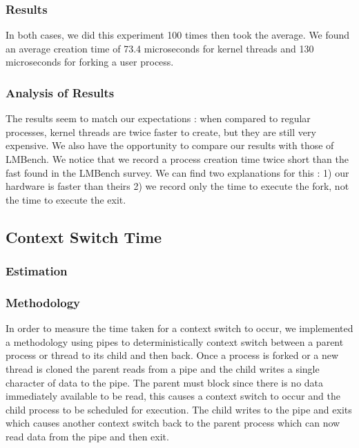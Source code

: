 \subsubsection{Results}

In both cases, we did this experiment 100 times then took the average. We found an average creation time of  73.4 microseconds for kernel threads and 130 microseconds for forking a user process.

\subsubsection{Analysis of Results}

The results seem to match our expectations : when compared to regular processes, kernel threads are twice faster to create, but they are still very expensive. We also have the opportunity to compare our results with those of LMBench. We notice that we record a process creation time twice short than the fast found in the LMBench survey. We can find two explanations for this : 1) our hardware is faster than theirs 2) we record only the time to execute the fork, not the time to execute the exit.

\subsection{Context Switch Time} 

\subsubsection{Estimation}

\subsubsection{Methodology}

In order to measure the time taken for a context switch to occur, we implemented
a methodology using pipes to deterministically context switch between a parent
process or thread to its child and then back. Once a process is forked or a new
thread is cloned the parent reads from a pipe and the child writes a single
character of data to the pipe. The parent must block since there is no data
immediately available to be read, this causes a context switch to occur and the
child process to be scheduled for execution. The child writes to the pipe and
exits which causes another context switch back to the parent process which can
now read data from the pipe and then exit. 

